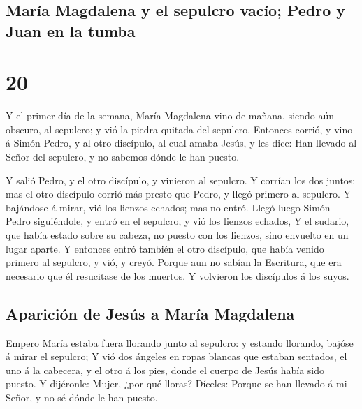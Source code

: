\hypertarget{maruxeda-magdalena-y-el-sepulcro-vacuxedo-pedro-y-juan-en-la-tumba}{%
\subsection{María Magdalena y el sepulcro vacío; Pedro y Juan en la
tumba}\label{maruxeda-magdalena-y-el-sepulcro-vacuxedo-pedro-y-juan-en-la-tumba}}

\hypertarget{section-19}{%
\section{20}\label{section-19}}

 Y el primer día de la semana, María Magdalena vino de
mañana, siendo aún obscuro, al sepulcro; y vió la piedra quitada del
sepulcro.  Entonces corrió, y vino á Simón Pedro, y al
otro discípulo, al cual amaba Jesús, y les dice: Han llevado al Señor
del sepulcro, y no sabemos dónde le han puesto.

 Y salió Pedro, y el otro discípulo, y vinieron al
sepulcro.  Y corrían los dos juntos; mas el otro discípulo
corrió más presto que Pedro, y llegó primero al sepulcro. 
Y bajándose á mirar, vió los lienzos echados; mas no entró.
 Llegó luego Simón Pedro siguiéndole, y entró en el
sepulcro, y vió los lienzos echados,  Y el sudario, que
había estado sobre su cabeza, no puesto con los lienzos, sino envuelto
en un lugar aparte.  Y entonces entró también el otro
discípulo, que había venido primero al sepulcro, y vió, y creyó.
 Porque aun no sabían la Escritura, que era necesario que
él resucitase de los muertos.  Y volvieron los discípulos
á los suyos.

\hypertarget{apariciuxf3n-de-jesuxfas-a-maruxeda-magdalena}{%
\subsection{Aparición de Jesús a María
Magdalena}\label{apariciuxf3n-de-jesuxfas-a-maruxeda-magdalena}}

 Empero María estaba fuera llorando junto al sepulcro: y
estando llorando, bajóse á mirar el sepulcro;  Y vió dos
ángeles en ropas blancas que estaban sentados, el uno á la cabecera, y
el otro á los pies, donde el cuerpo de Jesús había sido puesto.
 Y dijéronle: Mujer, ¿por qué lloras? Díceles: Porque se
han llevado á mi Señor, y no sé dónde le han puesto.

